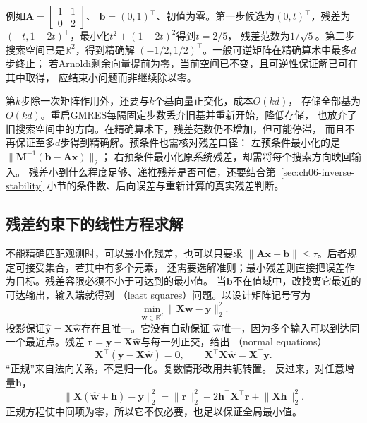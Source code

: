 例如$\bm A=\left[\begin{smallmatrix}1&1\\0&2\end{smallmatrix}\right]$、
$\bm b=(0,1)^\top$、初值为零。第一步候选为$(0,t)^\top$，残差为
$(-t,1-2t)^\top$，最小化$t^2+(1-2t)^2$得到$t=2/5$，
残差范数为$1/\sqrt5$。第二步搜索空间已是$\mathbb R^2$，得到精确解
$(-1/2,1/2)^\top$。一般可逆矩阵在精确算术中最多$d$步终止；
若Arnoldi剩余向量提前为零，当前空间已不变，且可逆性保证解已可在其中取得，
应结束小问题而非继续除以零。

第$k$步除一次矩阵作用外，还要与$k$个基向量正交化，成本$O(kd)$，
存储全部基为$O(kd)$。重启GMRES每隔固定步数丢弃旧基并重新开始，降低存储，
也放弃了旧搜索空间中的方向。在精确算术下，残差范数仍不增加，但可能停滞，
而且不再保证至多$d$步得到精确解。预条件也需核对残差口径：
左预条件最小化的是$\lVert\bm M^{-1}(\bm b-\bm A\bm x)\rVert_2$；
右预条件最小化原系统残差，却需将每个搜索方向映回输入。
残差小到什么程度足够、递推残差是否可信，还要结合第~\ref{sec:ch06-inverse-stability}
小节的条件数、后向误差与重新计算的真实残差判断。

\subsection{残差约束下的线性方程求解}
\label{sec:linear-algebra-residual-systems}
\label{sec:linear-algebra-projection-least-squares}

\label{sec:matrix-analysis-inverse-input-selection}

不能精确匹配观测时，可以最小化残差，也可以只要求
$\lVert\bm A\bm x-\bm b\rVert\leq\tau$。后者规定可接受集合，若其中有多个元素，
还需要选解准则；最小残差则直接把误差作为目标。残差容限必须不小于可达到的最小值。
当$\bm b$不在值域中，改找离它最近的可达输出，输入端就得到
（least squares）问题。以设计矩阵记号写为
\begin{equation}
 \min_{\bm w\in\mathbb R^d}\lVert\bm X\bm w-\bm y\rVert_2^2.
 \label{eq:linear-algebra-least-squares}
\end{equation}
投影保证$\widehat{\bm y}=\bm X\widehat{\bm w}$存在且唯一。它没有自动保证
$\widehat{\bm w}$唯一，因为多个输入可以到达同一个最近点。残差
$\bm r=\bm y-\bm X\widehat{\bm w}$与每一列正交，给出
（normal equations）
\begin{equation}
 \bm X^\top(\bm y-\bm X\widehat{\bm w})=\bm0,
 \qquad
 \bm X^\top\bm X\widehat{\bm w}=\bm X^\top\bm y.
 \label{eq:linear-algebra-normal-equations}
\end{equation}
“正规”来自法向关系，不是归一化。复数情形改用共轭转置。
反过来，对任意增量$\bm h$，
\[
 \lVert\bm X(\widehat{\bm w}+\bm h)-\bm y\rVert_2^2
 =\lVert\bm r\rVert_2^2-2\bm h^\top\bm X^\top\bm r
  +\lVert\bm X\bm h\rVert_2^2.
\]
正规方程使中间项为零，所以它不仅必要，也足以保证全局最小值。

